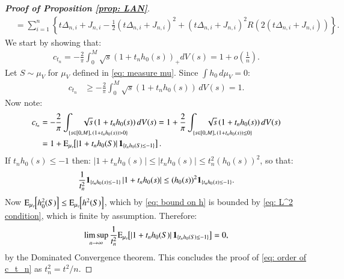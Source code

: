 \begin{proof}[\hypertarget{Proof of LAN prop}{\textbf{Proof of Proposition \ref{prop: LAN}}}]
\begin{align*}
        & = \sum_{i=1}^n \left\{ t \Delta_{n,i} +   J_{n,i} -\frac{1}{2}(t \Delta_{n,i} +   J_{n,i})^2 + (t \Delta_{n,i} +   J_{n,i})^2  R(2(t \Delta_{n,i} +   J_{n,i})) \right\} .
    \end{align*}
    We start by showing that:
    \begin{align}\label{eq: order of c_t_n}
        c_{t_n} =-\frac{2}{\pi} \int_0^M \sqrt{s}\left(1+t_n h_0(s)\right)_{+} d V(s) = 1 + o\left(\frac{1}{n} \right).
    \end{align}
    Let $S \sim \mu_{\scriptscriptstyle{V}}$ for $\mu_{\scriptscriptstyle{V}}$ defined in \eqref{eq: measure mu}. Since $\int h_0 \, d\mu_{\scriptscriptstyle{V}} = 0$:
    \begin{align*}
        c_{t_n} &  \geq -\frac{2}{\pi} \int_0^M \sqrt{s}\left(1+t_n h_0(s)\right) \, d V(s) =1.
    \end{align*}
     Now note:
\begin{align*}
c_{t_n} &  =-\frac{2}{\pi} \int_{\substack{\phantom{space} \\ \{   s \in [0, M], \, (1+t_n h_0(s)) > 0\}}} \hspace{-2cm} \sqrt{s}\left(1+t_n h_0(s)\right) d V(s)=1 + \frac{2}{\pi}  \int_{\substack{\phantom{space} \\ \{   s \in [0, M], \, (1+t_n h_0(s)) \leq 0\}}} \hspace{-2cm} \sqrt{s}\left(1+t_n h_0(s)\right) d V(s) \\
& =1+\ex_{\scriptstyle{\mu_{\scaleto{V}{2.5pt}}}} \hspace{-0.1cm} \left[\left|1+t_n h_0(S)\right| \ind_{ \{  t_n h_0(S) \leq -1 \} } \right].
\end{align*}
If $t_n h_0(s) \leq -1$ then: $|1+ t_n h_0(s)| \leq |t_n h_0(s)| \leq t^2_n (h_0(s))^2$, so that:
\begin{align}\label{eq: upper bound h_0 on small set}
    \frac{1}{t_n^2} \mathbf{1}_{ \{  t_n h_0(s) \leq -1 \} } \left|1+t_n h_0(s)\right| \leq (h_0(s))^2 \mathbf{1}_{ \{  t_n h_0(s) \leq -1 \} }.
\end{align}
Now $\ex_{\scriptstyle{\mu_{\scaleto{V}{2.5pt}}}} \hspace{-0.1cm} \left[ h^2_0(S)\right] \leq  \ex_{\scriptstyle{\mu_{\scaleto{V}{2.5pt}}}} \hspace{-0.1cm} \left[ h^2(S)\right]$, which by \eqref{eq: bound on h} is bounded by \eqref{eq: L^2 condition}, which is finite by assumption. Therefore:
\begin{align}\label{eq: residual under measure mu_v}
    \limsup_{n \rightarrow \infty} \frac{1}{t^2_n} \ex_{\scriptstyle{\mu_{\scaleto{V}{2.5pt}}}} \hspace{-0.1cm} \left[\left|1+t_n h_0(S)\right| \ind_{ \{  t_n h_0(S) \leq -1 \} } \right] = 0,
\end{align}
by the Dominated Convergence theorem. This concludes the proof of \eqref{eq: order of c_t_n} as $t^2_n = t^2/n$.


\end{proof}
